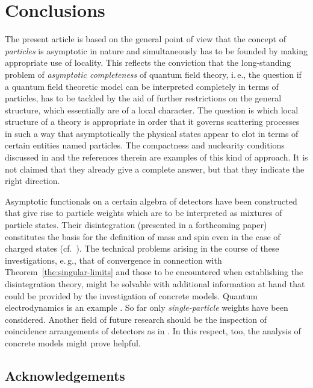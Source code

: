 \documentclass[a4paper,a4paper]{article}
\numberwithin{equation}{section}
\theoremstyle{definition}
\theoremstyle{plain}
\theoremstyle{remark}
\begin{document}
\section{Conclusions}
  \label{sec:conclusions}
  
  The present article is based on the general point of view that the
  concept of \emph{particles} is asymptotic in nature and
  simultaneously has to be founded by making appropriate use of
  locality. This reflects the conviction that the long-standing
  problem of \emph{asymptotic completeness} of quantum field theory,
  i.\,e., the question if a quantum field theoretic model can be
  interpreted completely in terms of particles, has to be tackled by
  the aid of further restrictions on the general structure, which
  essentially are of a local character. The question is which local
  structure of a theory is appropriate in order that it governs
  scattering processes in such a way that asymptotically the physical
  states appear to clot in terms of certain entities named particles.
  The compactness and nuclearity conditions discussed in
  \cite{buchholz/porrmann:1990} and the references therein are
  examples of this kind of approach. It is not claimed that they
  already give a complete answer, but that they indicate the right
  direction.
  
  Asymptotic functionals on a certain algebra of detectors have been
  constructed that give rise to particle weights which are to be
  interpreted as mixtures of particle states. Their disintegration
  (presented in a forthcoming paper) constitutes the basis for the
  definition of mass and spin even in the case of charged states
  (cf.~\cite{buchholz/porrmann/stein:1991}). The technical problems
  arising in the course of these investigations, e.\,g., that of
  convergence in connection with Theorem~\ref{the:singular-limits} and
  those to be encountered when establishing the disintegration theory,
  might be solvable with additional information at hand that could be
  provided by the investigation of concrete models. Quantum
  electrodynamics is an example \cite{fredenhagen/freund}. So far only
  \emph{single-particle} weights have been considered. Another field
  of future research should be the inspection of coincidence
  arrangements of detectors as in \cite{araki/haag:1967}. In this
  respect, too, the analysis of concrete models might prove helpful.


  \subsection*{Acknowledgements}
\end{document}
